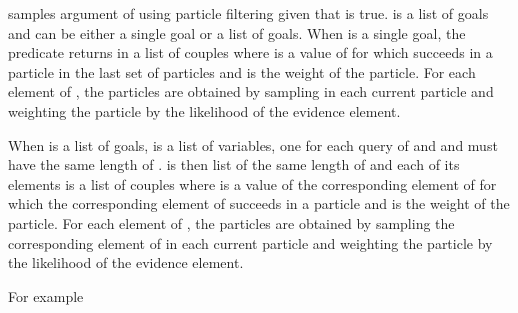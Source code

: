 \documentclass[letterpaper,10pt,english]{sphinxmanual}
\begin{document}
\sphinxAtStartPar
samples argument  of  using particle filtering given that  is true.  is a list of goals and  can be either a single goal or a list of goals.
When  is a single goal, the predicate returns in  a list of couples  where  is a value of  for which  succeeds in a particle in the last set of particles and  is the weight of the particle.
For each element of , the particles are obtained by sampling  in each current particle and weighting the particle by the likelihood of the evidence element.

\sphinxAtStartPar
When  is a list of goals,  is a list of variables, one for each query of  and  and  must have the same length of .
 is then list of the same length of  and each of its elements is a list of couples  where  is a value of the corresponding element of  for which the corresponding element of  succeeds in a particle and  is the weight of the particle.
For each element of , the particles are obtained by sampling the corresponding element of  in each current particle and weighting the particle by the likelihood of the evidence element.

\sphinxAtStartPar
For example
\end{document}
